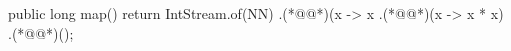 
\begin{ffcode}
public long map() {
  return IntStream.of(NN)
    .(*@@*)(x -> x %
    .(*@@*)(x -> x * x)
    .(*@@*)(); }
\end{ffcode}
